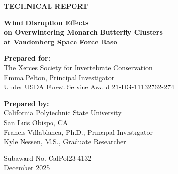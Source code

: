 \thispagestyle{empty}
\begin{center}

\vspace*{0.5in}

{\Large\bfseries TECHNICAL REPORT}

\vfill

{\LARGE\bfseries Wind Disruption Effects\\[0.5em]
on Overwintering Monarch Butterfly Clusters\\[0.5em]
at Vandenberg Space Force Base}

\vfill

\textbf{Prepared for:}\\[0.5em]
The Xerces Society for Invertebrate Conservation\\
Emma Pelton, Principal Investigator\\
Under USDA Forest Service Award 21-DG-11132762-274

\vfill

\textbf{Prepared by:}\\[0.5em]
California Polytechnic State University\\
San Luis Obispo, CA\\[1em]
Francis Villablanca, Ph.D., Principal Investigator\\
Kyle Nessen, M.S., Graduate Researcher

\vfill

Subaward No. CalPol23-4132\\[2em]
December 2025

\vspace*{0.5in}

\end{center}
